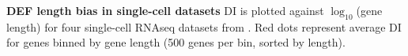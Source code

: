 \textbf{DEF length bias in single-cell datasets} DI is plotted against $\log_{10}$(gene length) for four single-cell RNAseq datasets from \citep{Zeisel_2015,Tasic_2016,Zeisel_2018,Saunders_2018}. Red dots represent average DI for genes binned by gene length (500 genes per bin, sorted by length).

